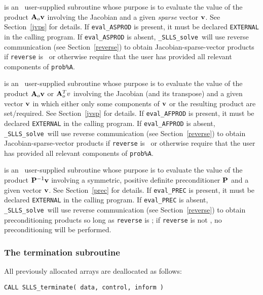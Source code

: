 \documentclass{galahad}
\newcommand{\packagename}{SLLS}
\newcommand{\fullpackagename}{\libraryname\_\packagename}
\newcommand{\solver}{{\tt \fullpackagename\_solve}}
\begin{document}
\begin{description}
 is an \optional\
user-supplied subroutine whose purpose is to evaluate the value of the
product ${\mathbf{A}}_o {\mathbf{v}}$  involving the Jacobian and a given {\em sparse}
vector ${\mathbf{v}}$.
See Section~\ref{jvps} for details.
If {\tt eval\_ASPROD} is present,
it must be declared {\tt EXTERNAL} in the calling program.
If {\tt eval\_ASPROD} is absent, \solver\ will use reverse communication
(see Section~\ref{reverse})
to obtain Jacobian-sparse-vector products if {\tt reverse} is \present\ or
otherwise require that the user has provided all relevant
components of {\tt prob\%A}.

 is an \optional\
user-supplied subroutine whose purpose is to evaluate the value of the
product ${\mathbf{A}}_o {\mathbf{v}}$ or ${\mathbf{A}}_o^T v$ involving the Jacobian (and its transpose)
and a given vector ${\mathbf{v}}$ in which either only some components of ${\mathbf{v}}$ or
the resulting product are set/required.
See Section~\ref{jvsp} for details.
If {\tt eval\_AFPROD} is present,
it must be declared {\tt EXTERNAL} in the calling program.
If {\tt eval\_AFPROD} is absent, \solver\ will use reverse communication
(see Section~\ref{reverse})
to obtain Jacobian-sparse-vector products if {\tt reverse} is \present\ or
otherwise require that the user has provided all relevant
components of {\tt prob\%A}.

 is an \optional\
user-supplied subroutine whose purpose is to evaluate the value of the
product ${\mathbf{P}}^{-1} {\mathbf{v}}$ involving a symmetric, positive definite 
preconditioner ${\mathbf{P}}$ and a given vector ${\mathbf{v}}$.
See Section~\ref{prec} for details.
If {\tt eval\_PREC} is present,
it must be declared {\tt EXTERNAL} in the calling program.
If {\tt eval\_PREC} is absent, \solver\ will use reverse communication
(see Section~\ref{reverse})
to obtain preconditioning products so long as {\tt reverse} is \present;
if {\tt reverse} is not \present, no preconditioning will be performed.

\end{description}


\subsubsection{The  termination subroutine}
All previously allocated arrays are deallocated as follows:
\vspace*{1mm}

\hspace{8mm}
{\tt CALL \packagename\_terminate( data, control, inform )}
\end{document}
